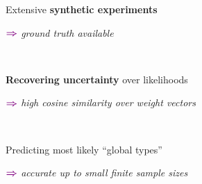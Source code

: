 \documentclass[xcolor={usenames,dvipsnames,svgnames}, compress, aspectratio=169, 11pt]{beamer}
\newcommand{\comment}[3][\small]{\begin{minipage}{1\linewidth}
          \raggedleft
          {
            $\color{violet}\boldsymbol\Rightarrow$
            #1
            {\emph{#2}}
          }
      \end{minipage}#3\\
}
\begin{document}
\begin{frame}[t, htt=bgrey2]
\begin{minipage}[t]{0.45\linewidth}
  \end{minipage}\hfill\begin{minipage}[t]{0.53\linewidth}
    \raggedright
    \vspace{20pt}

    Extensive \textbf{\textbf{synthetic experiments}}\\
    \comment[\small]{ground truth available}{}
    \vspace{10pt}
    
    \textbf{Recovering uncertainty} over likelihoods\\
     \comment[\small]{high cosine similarity over weight vectors}{}
    \vspace{10pt}

    Predicting most likely ``global types''\\
    \comment[\small]{accurate up to small finite sample sizes}{}
    
  \end{minipage}\hfill\begin{minipage}[t]{0.3\linewidth}
    \vspace{-150pt}
    
  \end{minipage}
  
\end{frame}
\end{document}
